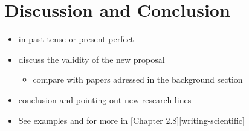\chapter{Discussion and Conclusion}
\label{sec:discussion-and-conclusion}
\begin{itemize}
    \item in past tense or present perfect
    \item discuss the validity of the new proposal
    \begin{itemize}
    	\item compare with papers adressed in the background section
    \end{itemize}
    \item conclusion and pointing out new research lines
    \item See examples and for more in [Chapter 2.8][writing-scientific]
\end{itemize}
